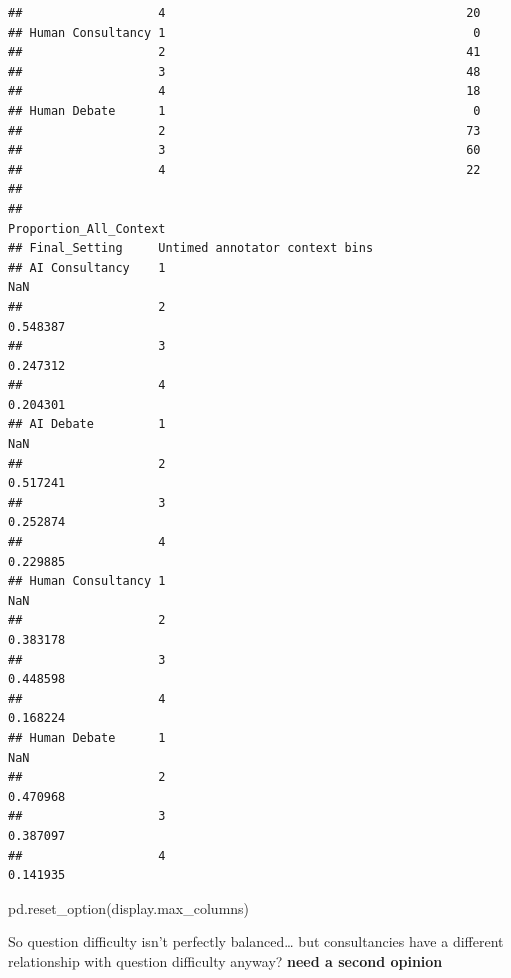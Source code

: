 \documentclass[
]{article}
\newenvironment{Shaded}{\begin{snugshade}}{\end{snugshade}}
\newcommand{\NormalTok}[1]{#1}
\newcommand{\StringTok}[1]{\textcolor[rgb]{0.31,0.60,0.02}{#1}}
\begin{document}
\begin{verbatim}
##                   4                                          20   
## Human Consultancy 1                                           0   
##                   2                                          41   
##                   3                                          48   
##                   4                                          18   
## Human Debate      1                                           0   
##                   2                                          73   
##                   3                                          60   
##                   4                                          22   
## 
##                                                   Proportion_All_Context  
## Final_Setting     Untimed annotator context bins                          
## AI Consultancy    1                                                  NaN  
##                   2                                             0.548387  
##                   3                                             0.247312  
##                   4                                             0.204301  
## AI Debate         1                                                  NaN  
##                   2                                             0.517241  
##                   3                                             0.252874  
##                   4                                             0.229885  
## Human Consultancy 1                                                  NaN  
##                   2                                             0.383178  
##                   3                                             0.448598  
##                   4                                             0.168224  
## Human Debate      1                                                  NaN  
##                   2                                             0.470968  
##                   3                                             0.387097  
##                   4                                             0.141935
\end{verbatim}

\begin{Shaded}
\begin{Highlighting}[]
\NormalTok{pd.reset\_option(}\StringTok{\textquotesingle{}display.max\_columns\textquotesingle{}}\NormalTok{)}
\end{Highlighting}
\end{Shaded}

So question difficulty isn't perfectly balanced\ldots{} but
consultancies have a different relationship with question difficulty
anyway? \textbf{need a second opinion}
\end{document}
